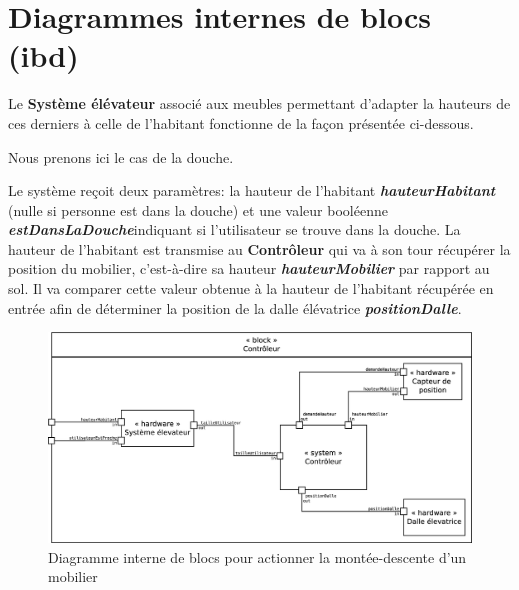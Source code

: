 \chapter{Diagrammes internes de blocs (ibd)}
Le \textbf{Système élévateur} associé aux meubles permettant d'adapter la hauteurs de ces derniers à celle de l'habitant fonctionne de la façon présentée ci-dessous.

Nous prenons ici le cas de la douche.

Le système reçoit deux paramètres: la hauteur de l'habitant \textbf{\textit{hauteurHabitant}} (nulle si personne est dans la douche) et une valeur booléenne \textbf{\textit{estDansLaDouche}}indiquant si l'utilisateur se trouve dans la douche. 
La hauteur de l'habitant est transmise au \textbf{Contrôleur} qui va à son tour récupérer la position du mobilier, c'est-à-dire sa hauteur \textbf{\textit{hauteurMobilier}} par rapport au sol. Il va comparer cette valeur obtenue à la hauteur de l'habitant récupérée en entrée afin de déterminer la position de la dalle élévatrice \textbf{\textit{positionDalle}}. 
\begin{figure}[H]
	\centering
	\includegraphics[width=1\linewidth]{diagrams/bathroom/diagramme_blocks_ibd.eps}
	\caption{Diagramme interne de blocs pour actionner la montée-descente d'un mobilier}
	\label{fig:diagramme_ibd}
\end{figure}
